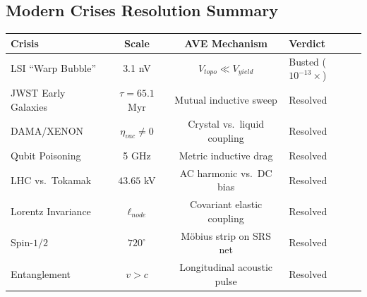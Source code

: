 \subsection*{Modern Crises Resolution Summary}
\begin{center}
\small
\renewcommand{\arraystretch}{1.2}
\begin{tabular}{lccl}
\toprule
\textbf{Crisis} & \textbf{Scale} & \textbf{AVE Mechanism} & \textbf{Verdict} \\
\midrule
LSI ``Warp Bubble'' & 3.1 nV & $V_{topo} \ll V_{yield}$ & Busted ($10^{-13}\times$) \\
JWST Early Galaxies & $\tau = 65.1$ Myr & Mutual inductive sweep & Resolved \\
DAMA/XENON & $\eta_{vac} \neq 0$ & Crystal vs.\ liquid coupling & Resolved \\
Qubit Poisoning & 5 GHz & Metric inductive drag & Resolved \\
LHC vs.\ Tokamak & $43.65$ kV & AC harmonic vs.\ DC bias & Resolved \\
Lorentz Invariance & $\ell_{node}$ & Covariant elastic coupling & Resolved \\
Spin-$1/2$ & $720^\circ$ & M\"obius strip on SRS net & Resolved \\
Entanglement & $v > c$ & Longitudinal acoustic pulse & Resolved \\
\bottomrule
\end{tabular}
\end{center}
